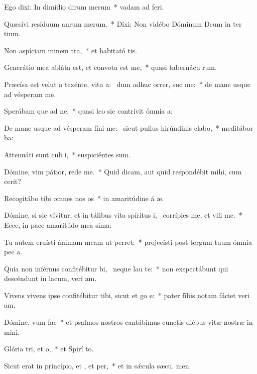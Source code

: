 \item Ego dixi: In dimídio dirum merum~* vadam ad  feri.
\item Quæsívi resíduum anrum merum.~* Dixi: Non vidébo Dóminum Deum in ter tium.
\item Non aspíciam minem tra,~* et habitató tis.
\item Generátio mea abláta est, et convota est  me,~* quasi tabernácu rum.
\item Præcísa est velut a texénte, vita a:~\pscross{} dum adhuc orrer, suc me:~* de mane usque ad vésperam  me.
\item Sperábam que ad ne,~* quasi leo sic contrívit ómnia  a:
\item De mane usque ad vésperam fíni me:~\pscross{} sicut pullus hirúndinis  clabo,~* meditábor  ba:
\item Attenuáti sunt culi i,~* suspiciéntes  sum.
\item Dómine, vim pátior, rede  me.~* Quid dicam, aut quid respondébit mihi, cum  cerit?
\item Recogitábo tibi omnes nos os~* in amaritúdine á æ.
\item Dómine, si sic vívitur, et in tálibus vita spíritus i,~\pscross{} corrípies me, et vifi me.~* Ecce, in pace amaritúdo mea sima:
\item Tu autem eruísti ánimam meam ut  perret:~* projecísti post tergum tuum ómnia pec a.
\item Quia non inférnus confitébitur bi,~\pscross{} neque  lau te:~* non exspectábunt qui descéndunt in lacum, veri am.
\item Vivens vivens ipse confitébitur tibi, sicut et go e:~* pater fíliis notam fáciet veri am.
\item Dómine, vum  fac~* et psalmos nostros cantábimus cunctis diébus vitæ nostræ in  mini.
\item Glória tri, et o,~* et Spirí to.
\item Sicut erat in princípio, et , et per,~* et in sǽcula sæcu. men.
